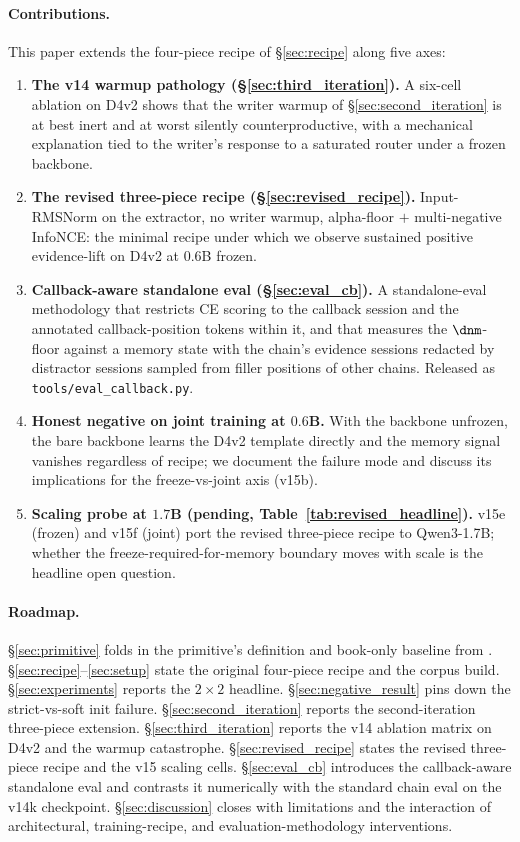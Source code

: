 \paragraph{Contributions.} This paper extends the four-piece recipe
of \S\ref{sec:recipe} along five axes:
\begin{enumerate}\setlength{\itemsep}{0pt}
\item \textbf{The v14 warmup pathology
(\S\ref{sec:third_iteration}).} A six-cell ablation on D4v2 shows
that the writer warmup of \S\ref{sec:second_iteration} is at best
inert and at worst silently counterproductive, with a mechanical
explanation tied to the writer's response to a saturated router
under a frozen backbone.
\item \textbf{The revised three-piece recipe
(\S\ref{sec:revised_recipe}).} Input-RMSNorm on the extractor, no
writer warmup, alpha-floor $+$ multi-negative InfoNCE: the
minimal recipe under which we observe sustained positive
evidence-lift on D4v2 at $0.6$B frozen.
\item \textbf{Callback-aware standalone eval
(\S\ref{sec:eval_cb}).} A standalone-eval methodology that
restricts CE scoring to the callback session and the annotated
callback-position tokens within it, and that measures the
$\dnm$-floor against a memory state with the chain's evidence
sessions redacted by distractor sessions sampled from filler
positions of other chains. Released as
\texttt{tools/eval\_callback.py}.
\item \textbf{Honest negative on joint training at $0.6$B.} With
the backbone unfrozen, the bare backbone learns the D4v2 template
directly and the memory signal vanishes regardless of recipe; we
document the failure mode and discuss its implications for the
freeze-vs-joint axis (v15b).
\item \textbf{Scaling probe at $1.7$B (pending,
Table~\ref{tab:revised_headline}).} v15e (frozen) and v15f (joint)
port the revised three-piece recipe to Qwen3-1.7B; whether the
freeze-required-for-memory boundary moves with scale is the
headline open question.
\end{enumerate}

\paragraph{Roadmap.} \S\ref{sec:primitive} folds in the primitive's
definition and book-only baseline from \cite{liu2025drop}.
\S\ref{sec:recipe}--\ref{sec:setup} state the original four-piece
recipe and the corpus build. \S\ref{sec:experiments} reports the
$2\!\times\!2$ headline. \S\ref{sec:negative_result} pins down
the strict-vs-soft init failure. \S\ref{sec:second_iteration}
reports the second-iteration three-piece extension.
\S\ref{sec:third_iteration} reports the v14 ablation matrix on
D4v2 and the warmup catastrophe. \S\ref{sec:revised_recipe}
states the revised three-piece recipe and the v15 scaling cells.
\S\ref{sec:eval_cb} introduces the callback-aware standalone eval
and contrasts it numerically with the standard chain eval on the
v14k checkpoint. \S\ref{sec:discussion} closes with limitations
and the interaction of architectural, training-recipe, and
evaluation-methodology interventions.
